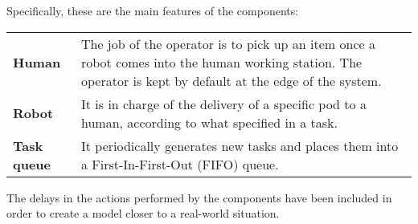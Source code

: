 \noindent Specifically, these are the main features of the components:
\vspace{0,5cm}

\begin{tabularx}{\textwidth}{lX}
\textbf{Human} & The job of the operator is to pick up an item once a robot comes into the human working station. The operator is kept by default at the edge of the system.\vspace{0,2cm}\\
\textbf{Robot} & It is in charge of the delivery of a specific pod to a human, according to what specified in a task.\vspace{0,2cm}\\
\textbf{Task queue} & It periodically generates new tasks and places them into a First-In-First-Out (FIFO) queue.\vspace{0,2cm}\\
\end{tabularx}

The delays in the actions performed by the components have been included in order to create a model closer to a real-world situation.
